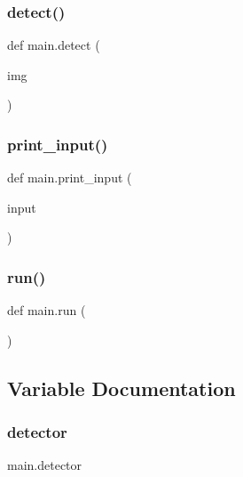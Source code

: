\mbox{\label{namespacemain_a03e14590002fed6ffd6ac75bfeb3403e}} 
\subsubsection{\texorpdfstring{detect()}{detect()}}
{\footnotesize\ttfamily def main.\+detect (\begin{DoxyParamCaption}\item[{}]{img }\end{DoxyParamCaption})}

\mbox{\label{namespacemain_a0fe3fdb168f80f23bd787b6a6645d063}} 
\subsubsection{\texorpdfstring{print\+\_\+input()}{print\_input()}}
{\footnotesize\ttfamily def main.\+print\+\_\+input (\begin{DoxyParamCaption}\item[{}]{input }\end{DoxyParamCaption})}

\mbox{\label{namespacemain_a036aad8f2646851dd9488dda7d35c981}} 
\subsubsection{\texorpdfstring{run()}{run()}}
{\footnotesize\ttfamily def main.\+run (\begin{DoxyParamCaption}{ }\end{DoxyParamCaption})}



\subsection{Variable Documentation}
\mbox{\label{namespacemain_a245786520a72f57bea29a2e43f964e8e}} 
\subsubsection{\texorpdfstring{detector}{detector}}
{\footnotesize\ttfamily main.\+detector}

